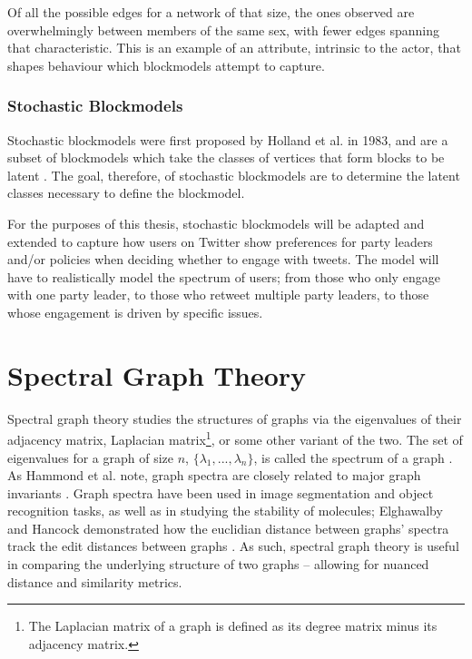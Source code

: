 Of all the possible edges for a network of that size, the ones observed are
overwhelmingly between members of the same sex, with fewer edges spanning that
characteristic. This is an example of an attribute, intrinsic to the actor, that
shapes behaviour which blockmodels attempt to capture. 

\subsubsection{Stochastic Blockmodels}

Stochastic blockmodels were first proposed by Holland et al. in 1983, and are a
subset of blockmodels which take the classes of vertices that form blocks to be
latent \cite{holland1983stochastic}. The goal, therefore, of stochastic
blockmodels are to determine the latent classes necessary to define the
blockmodel. 

For the purposes of this thesis, stochastic blockmodels will be adapted and
extended to capture how users on Twitter show preferences for party leaders
and/or policies when deciding whether to engage with tweets. The model will have
to realistically model the spectrum of users; from those who only engage with
one party leader, to those who retweet multiple party leaders, to those whose
engagement is driven by specific issues. 

\section{Spectral Graph Theory}\label{sec:spectralGraphTheory}

Spectral graph theory studies the structures of graphs via the eigenvalues of
their adjacency matrix, Laplacian matrix\footnote{The Laplacian matrix of a
graph is defined as its degree matrix minus its adjacency matrix.}, or some
other variant of the two. The set of eigenvalues for a graph of size $n$,
$\{\lambda_{1},...,\lambda_{n}\}$, is called the spectrum of a graph
\cite{netlsd}. As Hammond et al. note, graph spectra are closely related to
major graph invariants \cite{chung1997spectral}. Graph spectra have been used in
image segmentation and object recognition tasks, as well as in studying the
stability of molecules; Elghawalby and Hancock demonstrated how the euclidian
distance between graphs' spectra track the edit distances between graphs
\cite{elghawalby2008measuring,chung1997spectral}. As such, spectral graph theory
is useful in comparing the underlying structure of two graphs -- allowing for
nuanced distance and similarity metrics.   

